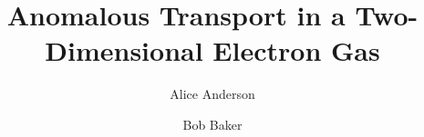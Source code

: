 \title{Anomalous Transport in a Two-Dimensional Electron Gas}
\author*[1,2]{Alice Anderson}
\author[2]{Bob Baker}
\address[1]{Department of Physics, University A, City A, Country A}
\address[2]{National High Field Laboratory, City B, Country B}
\maketitle
